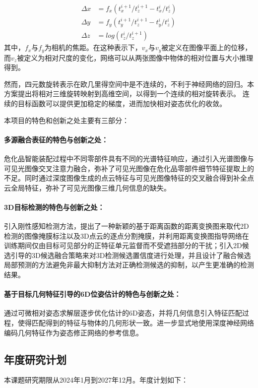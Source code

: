 \documentclass[12pt]{article}
\newcommand{\myPara}[1]{\paragraph{#1：}}
\begin{document}
\begin{equation}
    \begin{aligned}
    \Delta x & = f_x(t_x^{i+1}/t_z^{i+1} - t_x^i/t_z^i)\\
    \Delta y & = f_y(t_y^{i+1}/t_z^{i+1} - t_y^i/t_z^i) \\
    \Delta z & = log(t_z^i/t_z^{i+1})
\end{aligned}
\end{equation}
其中，$f_x$与$f_y$为相机的焦距。在这种表示下，$v_x$与$v_y$被定义在图像平面上的位移，而$v_z$被定义为相对尺度的变化，网络可以从两张图像中物体的相对位置与大小推理得到。

然而，四元数旋转表示在欧几里得空间中是不连续的，不利于神经网络的回归。本方案提出将相对三维旋转映射到高维空间，以得到一个连续的相对旋转表示。
连续的目标函数可以提供更加稳定的梯度，进而加快相对姿态优化的收敛。
    





本项目的特色和创新之处主要有三部分：
\myPara{多源融合表征的特色与创新之处}
危化品智能装配过程中不同零部件具有不同的光谱特征响应，通过引入光谱图像与可见光图像交叉注意力融合，弥补了可见光图像在危化品零部件细节特征提取上的不足。同时通过深度图像生成的点云特征与可见光图像特征的交叉融合得到补全点云全局特征，弥补了可见光图像三维几何信息的缺失。

\myPara{3D目标检测的特色与创新之处}
引入刚性感知检测方法，提出了一种新颖的基于距离函数的距离变换图来取代2D检测的图像掩膜标注以及3D点云的逐点分割掩膜，并利用距离变换图指导网络在训练期间仅由目标可见部分的正特征单元监督而不受遮挡部分的干扰；引入2D候选引导的3D候选融合策略来对3D检测候选置信度进行处理，并且设计了融合候选局部预测的方法避免非最大抑制方法对正确检测候选的抑制，以产生更准确的检测结果。
\myPara{基于目标几何特征引导的6D位姿估计的特色与创新之处}
通过可微相对姿态求解层逐步优化估计的6D姿态，并将几何信息引入特征匹配过程，使得匹配得到的特征与物体的几何形状一致。进一步显式地使用深度神经网络编码几何特征作为姿态修正网络的参考信息。


\subsection{年度研究计划}

本课题研究期限从2024年1月到2027年12月。年度计划如下：  
\end{document}
